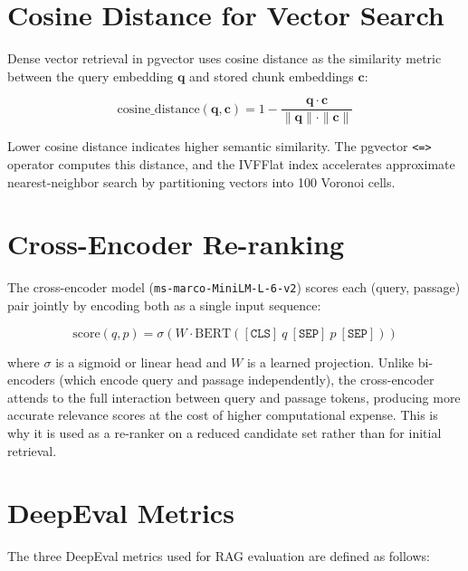 \section{Cosine Distance for Vector Search}

Dense vector retrieval in pgvector uses cosine distance as the similarity metric between the query embedding $\mathbf{q}$ and stored chunk embeddings $\mathbf{c}$:

\begin{equation}
\text{cosine\_distance}(\mathbf{q}, \mathbf{c}) = 1 - \frac{\mathbf{q} \cdot \mathbf{c}}{\|\mathbf{q}\| \cdot \|\mathbf{c}\|}
\end{equation}

Lower cosine distance indicates higher semantic similarity. The pgvector \texttt{<=>} operator computes this distance, and the IVFFlat index accelerates approximate nearest-neighbor search by partitioning vectors into 100 Voronoi cells.

\section{Cross-Encoder Re-ranking}

The cross-encoder model (\texttt{ms-marco-MiniLM-L-6-v2}) scores each (query, passage) pair jointly by encoding both as a single input sequence:

\begin{equation}
\text{score}(q, p) = \sigma\left(W \cdot \text{BERT}([\texttt{CLS}]\ q\ [\texttt{SEP}]\ p\ [\texttt{SEP}])\right)
\end{equation}

where $\sigma$ is a sigmoid or linear head and $W$ is a learned projection. Unlike bi-encoders (which encode query and passage independently), the cross-encoder attends to the full interaction between query and passage tokens, producing more accurate relevance scores at the cost of higher computational expense. This is why it is used as a re-ranker on a reduced candidate set rather than for initial retrieval.

\section{DeepEval Metrics}

The three DeepEval metrics used for RAG evaluation are defined as follows:

